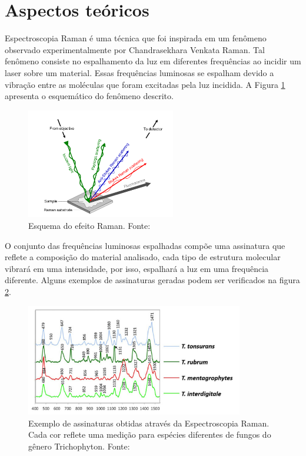 \documentclass[conference,peerreview]{IEEEtran}
\begin{document}
\section{Aspectos teóricos}

Espectroscopia Raman é uma técnica que foi inspirada em um fenômeno observado experimentalmente por Chandrasekhara Venkata Raman. Tal fenômeno consiste no espalhamento da luz em diferentes frequências ao incidir um laser sobre um material. Essas frequências luminosas se espalham devido a vibração entre as moléculas que foram excitadas pela luz incidida. A Figura \ref{incidencia_luminosa_exemplo} apresenta o esquemático do fenômeno descrito.

\begin{figure}[ht]
\centering
\includegraphics[width=6.5cm]{incidencia_luminosa_exemplo}
\caption{Esquema do efeito Raman. Fonte: \cite{Butler2016}}
\label{incidencia_luminosa_exemplo}
\end{figure}

O conjunto das frequências luminosas espalhadas compõe uma assinatura que reflete a composição do material analisado, cada tipo de estrutura molecular vibrará em uma intensidade, por isso, espalhará a luz em uma frequência diferente. Alguns exemplos de assinaturas geradas podem ser verificados na figura \ref{assinatura_raman_exemplo}.

\begin{figure}[ht]
\centering
\includegraphics[width=9.5cm]{assinatura_raman_exemplo}
\caption{Exemplo de assinaturas obtidas através da Espectroscopia Raman. Cada cor reflete uma medição para espécies diferentes de fungos do gênero Trichophyton. Fonte: \cite{Pankin2018}}
\label{assinatura_raman_exemplo}
\end{figure}
\end{document}
